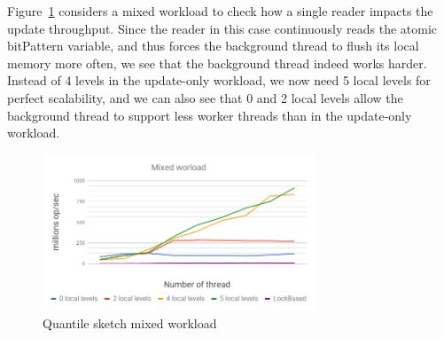 Figure~\ref{fig:ConccurentQuantilesReader} considers a
mixed workload to check how a single reader impacts the update
throughput.
Since the reader in this case continuously reads the atomic
bitPattern variable, and thus forces the background thread to
flush its local memory more often, we see that the background
thread indeed works harder.
Instead of 4 levels in the update-only workload, we now need 5
local levels for perfect scalability, and we can also see that
0 and 2 local levels allow the background thread to support less
worker threads than in the update-only workload.


\begin{figure}[h]
  \centering
  \includegraphics*[width=3.2in]{images/QuantilesMixed}
  \caption{Quantile sketch mixed workload}
   \label{fig:ConccurentQuantilesReader}
\end{figure}
